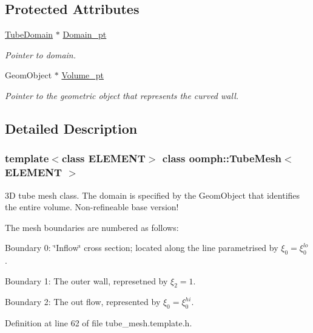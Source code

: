 \subsection*{Protected Attributes}
\begin{DoxyCompactItemize}
\item 
\hyperlink{classoomph_1_1TubeDomain}{Tube\+Domain} $\ast$ \hyperlink{classoomph_1_1TubeMesh_aa40f91e3d55b4ab61304d0b8eca3859f}{Domain\+\_\+pt}
\begin{DoxyCompactList}\small\item\em Pointer to domain. \end{DoxyCompactList}\item 
Geom\+Object $\ast$ \hyperlink{classoomph_1_1TubeMesh_a3b89c07eff15d0eb9d5fe9e0c93f8ec2}{Volume\+\_\+pt}
\begin{DoxyCompactList}\small\item\em Pointer to the geometric object that represents the curved wall. \end{DoxyCompactList}\end{DoxyCompactItemize}


\subsection{Detailed Description}
\subsubsection*{template$<$class E\+L\+E\+M\+E\+NT$>$\newline
class oomph\+::\+Tube\+Mesh$<$ E\+L\+E\+M\+E\+N\+T $>$}

3D tube mesh class. The domain is specified by the Geom\+Object that identifies the entire volume. Non-\/refineable base version! 

The mesh boundaries are numbered as follows\+:
\begin{DoxyItemize}
\item Boundary 0\+: \char`\"{}\+Inflow\char`\"{} cross section; located along the line parametrised by $ \xi_0 = \xi_0^{lo} $.
\item Boundary 1\+: The outer wall, represetned by $\xi_2 = 1$.
\item Boundary 2\+: The out flow, represented by $\xi_0 = \xi_0^{hi}$. 
\end{DoxyItemize}

Definition at line 62 of file tube\+\_\+mesh.\+template.\+h.



